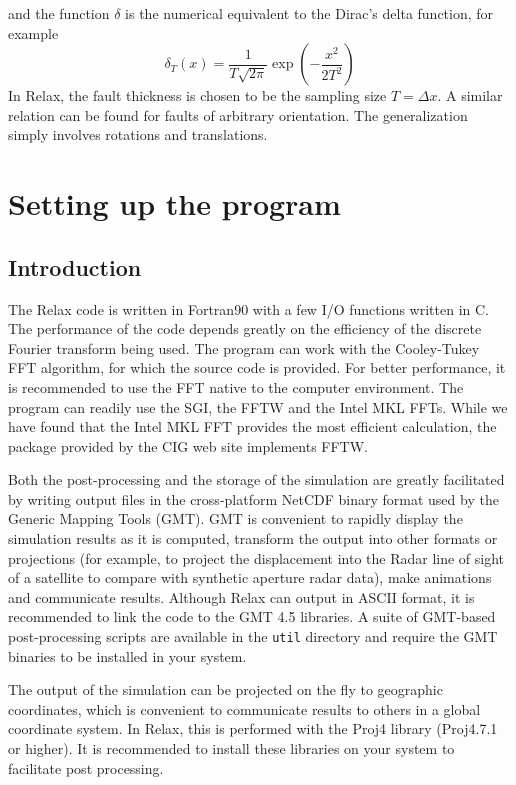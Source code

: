 \documentclass[10pt]{article}
\begin{document}
and the function $\delta$ is the numerical equivalent to the Dirac's delta function, for example
\begin{equation}
\delta_T(x)=\frac{1}{T\sqrt{2\pi}}\exp\!\left(-\frac{x^2}{2T^2}\right)
\end{equation}
In Relax, the fault thickness is chosen to be the sampling size $T=\Delta x$. A similar relation can be found for faults of arbitrary orientation. The generalization simply involves rotations and translations. 

\pagebreak
\section{Setting up the program}

\subsection{Introduction}
The Relax code is written in Fortran90 with a few I/O functions written in C. The performance of the code depends greatly on the efficiency of the discrete Fourier transform being used. The program can work with the Cooley-Tukey FFT algorithm, for which the source code is provided. For better performance, it is recommended to use the FFT native to the computer environment. The program can readily use the SGI, the FFTW and the Intel MKL FFTs. While we have found that the Intel MKL FFT provides the most efficient calculation, the package provided by the CIG web site implements FFTW.

Both the post-processing and the storage of the simulation are greatly facilitated by writing output files in the cross-platform NetCDF binary format used by the Generic Mapping Tools (GMT). GMT is convenient to rapidly display the simulation results as it is computed, transform the output into other formats or projections (for example, to project the displacement into the Radar line of sight of a satellite to compare with synthetic aperture radar data), make animations and communicate results. Although Relax can output in ASCII format, it is recommended to link the code to the GMT 4.5 libraries. A suite of GMT-based post-processing scripts are available in the \verb`util` directory and require the GMT binaries to be installed in your system.

The output of the simulation can be projected on the fly to geographic coordinates, which is convenient to communicate results to others in a global coordinate system. In Relax, this is performed with the Proj4 library (Proj4.7.1 or higher). It is recommended to install these libraries on your system to facilitate post processing.
\end{document}
